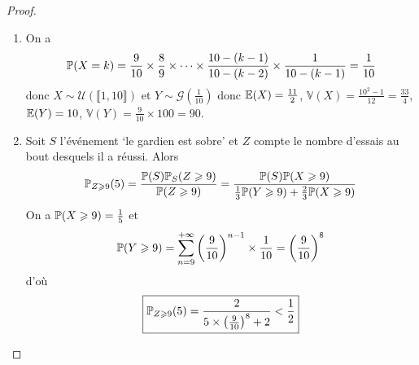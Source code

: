 \begin{proof}
    \phantom{}
    \begin{enumerate}
        \item On a 
        \begin{equation}
            \P(X=k)=\frac{9}{10}\times\frac{8}{9}\times\dots\times\frac{10-(k-1)}{10-(k-2)}\times\frac{1}{10-(k-1)}=\frac{1}{10}
        \end{equation}
        donc $X\sim\mathcal{U}\left(\llbracket1,10\rrbracket\right)$ et $Y\sim\mathcal{G}\left(\frac{1}{10}\right)$ donc $\E(X)=\frac{11}{2}$, $\mathbb{V}(X)=\frac{10^{2}-1}{12}=\frac{33}{4}$, $\E(Y)=10$, $\mathbb{V}(Y)=\frac{9}{10}\times100=90$.

        \item Soit $S$ l'événement `le gardien est sobre' et $Z$ compte le nombre d'essais au bout desquels il a réussi. Alors 
        \begin{equation}
            \P_{Z\geqslant 9}(5)=\frac{\P(S)\P_{S}(Z\geqslant9)}{\P(Z\geqslant9)}=\frac{\P(S)\P(X\geqslant9)}{\frac{1}{3}\P(Y\geqslant9)+\frac{2}{3}\P(X\geqslant9)}
        \end{equation}
        On a $\P(X\geqslant9)=\frac{1}{5}$ et 
        \begin{equation}
            \P(Y\geqslant9)=\sum_{n=9}^{+\infty}\left(\frac{9}{10}\right)^{n-1}\times\frac{1}{10}=\left(\frac{9}{10}\right)^{8}
        \end{equation}
        d'où 
        \begin{equation}
            \boxed{\P_{Z\geqslant9}(5)=\frac{2}{5\times\left(\frac{9}{10}\right)^{8}+2}<\frac{1}{2}}
        \end{equation}
    \end{enumerate}
\end{proof}

